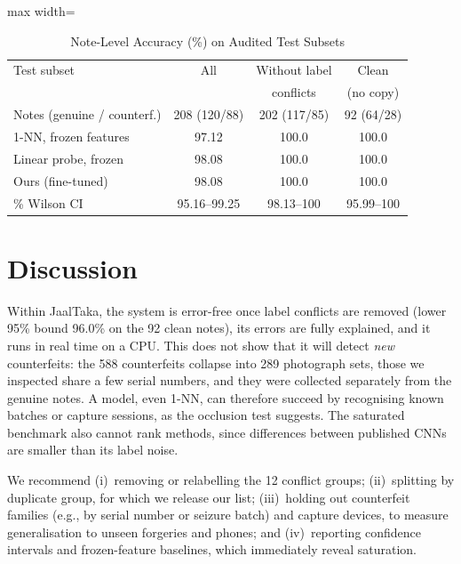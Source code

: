 \documentclass[journal]{IEEEtran}
\begin{document}
\begin{table}[!t]
\caption{Note-Level Accuracy (\%) on Audited Test Subsets}
\label{tab:clean}
\centering
\footnotesize
\setlength{\tabcolsep}{4pt}
\begin{adjustbox}{max width=\columnwidth}
\begin{tabular}{@{}lccc@{}}
\toprule
Test subset & All & Without label & Clean \\
& & conflicts & (no copy) \\
\midrule
Notes (genuine / counterf.) & 208 (120/88) & 202 (117/85) & 92 (64/28) \\
\midrule
1-NN, frozen features & 97.12 & 100.0 & 100.0 \\
Linear probe, frozen & 98.08 & 100.0 & 100.0 \\
Ours (fine-tuned) & 98.08 & 100.0 & 100.0 \\
\quad 95\% Wilson CI & 95.16--99.25 & 98.13--100 & 95.99--100 \\
\bottomrule
\end{tabular}
\end{adjustbox}
\end{table}

\section{Discussion}
\label{sec:discussion}

Within JaalTaka, the system is error-free once label conflicts are removed (lower 95\%
bound 96.0\% on the 92 clean notes), its errors are fully explained, and it runs in real
time on a CPU. This does not show that it will detect \emph{new} counterfeits: the 588
counterfeits collapse into 289 photograph sets, those we inspected share a few serial
numbers, and they were collected separately from the genuine notes. A model, even 1-NN,
can therefore succeed by recognising known batches or capture sessions, as the occlusion
test suggests. The saturated benchmark also cannot rank methods, since differences
between published CNNs are smaller than its label noise.

We recommend (i)~removing or relabelling the 12 conflict groups; (ii)~splitting by
duplicate group, for which we release our list; (iii)~holding out counterfeit families
(e.g., by serial number or seizure batch) and capture devices, to measure generalisation
to unseen forgeries and phones; and (iv)~reporting confidence intervals and
frozen-feature baselines, which immediately reveal saturation.
\end{document}
